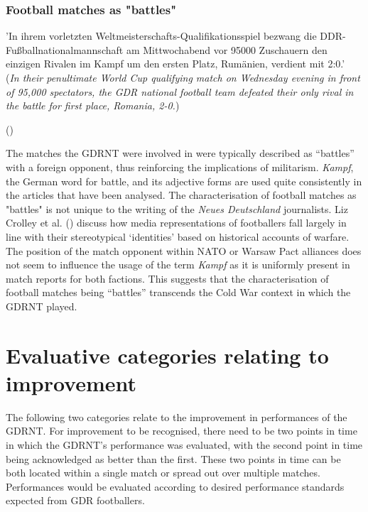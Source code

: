 \subsubsection*{Football matches as "battles"}

\begin{displayquote}
\begin{small}
'In ihrem vorletzten Weltmeisterschafts-Qualifikationsspiel bezwang die DDR-Fußballnationalmannschaft am Mittwochabend vor 95000 Zuschauern den einzigen Rivalen im Kampf um den ersten Platz, Rumänien, verdient mit 2:0.'\\
(\textit{In their penultimate World Cup qualifying match on Wednesday evening in front of 95,000 spectators, the GDR national football team defeated their only rival in the battle for first place, Romania, 2-0.})\
\begin{flushright}\footnotesize (\cite{nd19730927})\end{flushright}
\end{small}
\end{displayquote}

The matches the GDRNT were involved in were typically described as “battles” with a foreign opponent, thus reinforcing the implications of militarism. \textit{Kampf}, the German word for battle, and its adjective forms are used quite consistently in the articles that have been analysed. The characterisation of football matches as "battles" is not unique to the writing of the \textit{Neues Deutschland} journalists. Liz Crolley et al. (\citeyear{crolleyhandjeutter2000}) discuss how media representations of footballers fall largely in line with their stereotypical ‘identities’ based on historical accounts of warfare. The position of the match opponent within NATO or Warsaw Pact alliances does not seem to influence the usage of the term \textit{Kampf} as it is uniformly present in match reports for both factions. This suggests that the characterisation of football matches being “battles” transcends the Cold War context in which the GDRNT played.

\section*{Evaluative categories relating to improvement}

The following two categories relate to the improvement in performances of the GDRNT. For improvement to be recognised, there need to be two points in time in which the GDRNT’s performance was evaluated, with the second point in time being acknowledged as better than the first. These two points in time can be both located within a single match or spread out over multiple matches. Performances would be evaluated according to desired performance standards expected from GDR footballers.

